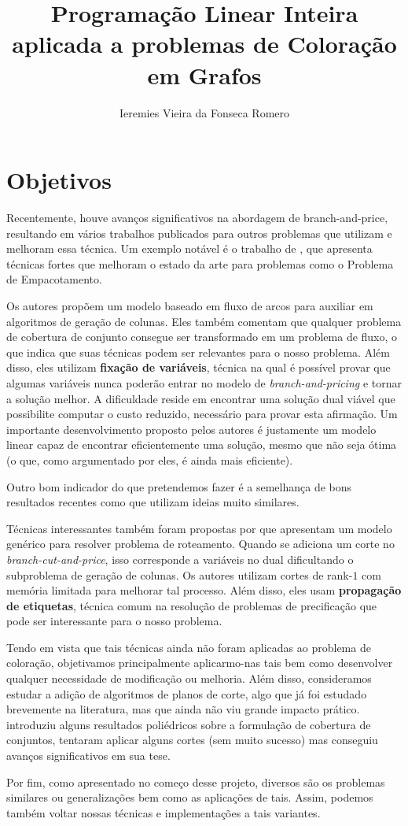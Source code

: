 \documentclass[11pt]{article}
\author{Ieremies Vieira da Fonseca Romero}
\date{}
\title{Programação Linear Inteira aplicada a problemas de Coloração em Grafos}
\begin{document}
\maketitle
\section{Objetivos}
\label{sec:orgb064508}
Recentemente, houve avanços significativos na abordagem de branch-and-price, resultando em vários trabalhos publicados para outros problemas que utilizam e melhoram essa técnica.
Um exemplo notável é o trabalho de \textcite{Lima2022Exactsolutionnetwork}, que apresenta técnicas fortes que melhoram o estado da arte para problemas como o Problema de Empacotamento.

Os autores propõem um modelo baseado em fluxo de arcos para auxiliar em algoritmos de geração de colunas.
Eles também comentam que qualquer problema de cobertura de conjunto consegue ser transformado em um problema de fluxo, o que indica que suas técnicas podem ser relevantes para o nosso problema.
Além disso, eles utilizam \textbf{fixação de variáveis}, técnica na qual é possível provar que algumas variáveis nunca poderão entrar no modelo de \emph{branch-and-pricing} e tornar a solução melhor.
A dificuldade reside em encontrar uma solução dual viável que possibilite computar o custo reduzido, necessário para provar esta afirmação.
Um importante desenvolvimento proposto pelos autores é justamente um modelo linear capaz de encontrar eficientemente uma solução, mesmo que não seja ótima (o que, como argumentado por eles, é ainda mais eficiente).

Outro bom indicador do que pretendemos fazer é a semelhança de bons resultados recentes como \textcite{Hoeve2021Graphcoloringdecision} que utilizam ideias muito similares.

Técnicas interessantes também foram propostas por \textcite{Pessoa2021SolvingBinPacking} que apresentam um modelo genérico para resolver problema de roteamento.
Quando se adiciona um corte no \emph{branch-cut-and-price}, isso corresponde a variáveis no dual dificultando o subproblema de geração de colunas.
Os autores utilizam cortes de rank-\(1\) com memória limitada para melhorar tal processo.
Além disso, eles usam \textbf{propagação de etiquetas}, técnica comum na resolução de problemas de precificação que pode ser interessante para o nosso problema.

Tendo em vista que tais técnicas ainda não foram aplicadas ao problema de coloração, objetivamos principalmente aplicarmo-nas tais bem como desenvolver qualquer necessidade de modificação ou melhoria.
Além disso, consideramos estudar a adição de algoritmos de planos de corte, algo que já foi estudado brevemente na literatura, mas que ainda não viu grande impacto prático. \textcite{Schindl2005Somecombinatorialoptimization} introduziu alguns resultados poliédricos sobre a formulação de cobertura de conjuntos, \textcite{Hansen2009Setcoveringpacking} tentaram aplicar alguns cortes (sem muito sucesso) mas \textcite{Hulst2021branchpricecut} conseguiu avanços significativos em sua tese.

Por fim, como apresentado no começo desse projeto, diversos são os problemas similares ou generalizações bem como as aplicações de tais.
Assim, podemos também voltar nossas técnicas e implementações a tais variantes.
\end{document}

